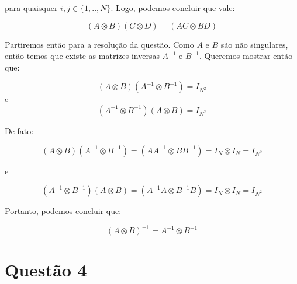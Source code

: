 \documentclass[]{abntex2}
\begin{document}
para quaisquer $i,j \in \{1,..,N\}$. Logo, podemos concluir que vale:

\begin{equation*}
	(A \otimes B)(C \otimes D) = (AC \otimes BD)
\end{equation*}

Partiremos então para a resolução da questão. Como $A$ e $B$ são não singulares, então temos que existe as matrizes inversas $A^{-1}$ e $B^{-1}$. Queremos mostrar então que:

\begin{equation*}
	(A \otimes B)(A^{-1} \otimes B^{-1}) = I_{N^2}
\end{equation*}
e
\begin{equation*}
	(A^{-1} \otimes B^{-1}) (A \otimes B) = I_{N^2}
\end{equation*}

De fato:

\begin{equation*}
	(A \otimes B)(A^{-1} \otimes B^{-1}) = (A{A}^{-1} \otimes B{B}^{-1}) = I_N \otimes I_N = I_{N^2}
\end{equation*}

e

\begin{equation*}
	(A^{-1} \otimes B^{-1}) (A \otimes B) = ({A}^{-1}A \otimes {B}^{-1}B) = I_N \otimes I_N = I_{N^2}
\end{equation*}

Portanto, podemos concluir que:

\begin{tcolorbox}
	\[
		{(A \otimes B)}^{-1} = A^{-1} \otimes B^{-1}
	\]
	\end{tcolorbox}


\section*{\textbf{Questão 4}}
\end{document}
